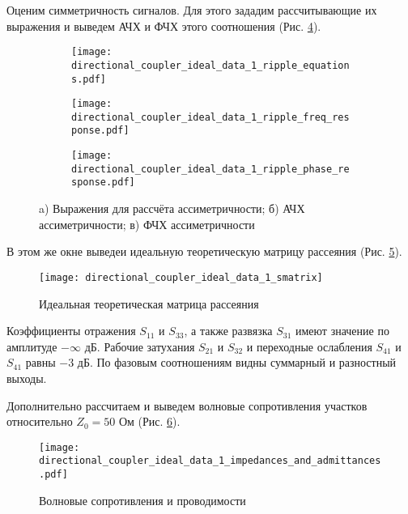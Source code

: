 Оценим симметричность сигналов. Для этого зададим рассчитывающие их выражения и выведем АЧХ и ФЧХ этого соотношения (Рис. \ref{fig:directional_coupler_ideal_data_1_ripple_responses}).

\begin{figure}[!ht]
    \centering
    \begin{subfigure}[b]{\textwidth}
        \centering
        \texttt{[image: directional\_coupler\_ideal\_data\_1\_ripple\_equations.pdf]}
        \caption{}
        \label{fig:directional_coupler_ideal_ripple_equations}
    \end{subfigure}
    \vfill
    \begin{subfigure}[b]{0.45\textwidth}
        \centering
        \texttt{[image: directional\_coupler\_ideal\_data\_1\_ripple\_freq\_response.pdf]}
        \caption{}
        \label{fig:directional_coupler_ideal_data_1_ripple_freq_response}
    \end{subfigure}
    \hfill
    \begin{subfigure}[b]{0.45\textwidth}
        \centering
        \texttt{[image: directional\_coupler\_ideal\_data\_1\_ripple\_phase\_response.pdf]}
        \caption{}
        \label{fig:directional_coupler_ideal_data_1_ripple_phase_response}
    \end{subfigure}
    \caption{
        a) Выражения для рассчёта ассиметричности;
        б) АЧХ ассиметричности;
        в) ФЧХ ассиметричности
    }
    \label{fig:directional_coupler_ideal_data_1_ripple_responses}
\end{figure}

В этом же окне выведеи идеальную теоретическую матрицу рассеяния (Рис. \ref{fig:directional_coupler_ideal_data_1_smatrix}).
\begin{figure}[!ht]
    \centering
    \texttt{[image: directional\_coupler\_ideal\_data\_1\_smatrix]}
    \caption{Идеальная теоретическая матрица рассеяния}
    \label{fig:directional_coupler_ideal_data_1_smatrix}
\end{figure}
Коэффициенты отражения $S_{11}$ и $S_{33}$, а также развязка $S_{31}$ имеют значение по амплитуде $-\infty \text{~дБ}$. Рабочие затухания $S_{21}$ и $S_{32}$ и переходные ослабления $S_{41}$ и $S_{41}$ равны $-3 \text{~дБ}$. По фазовым соотношениям видны суммарный и разностный выходы.

Дополнительно рассчитаем и выведем волновые сопротивления участков относительно $Z_0 = 50 \text{~Ом}$ (Рис. \ref{fig:directional_coupler_ideal_data_1_impedances_and_admittances}).
\begin{figure}[!ht]
    \centering
    \texttt{[image: directional\_coupler\_ideal\_data\_1\_impedances\_and\_admittances.pdf]}
    \caption{Волновые сопротивления и проводимости}
    \label{fig:directional_coupler_ideal_data_1_impedances_and_admittances}
\end{figure}

